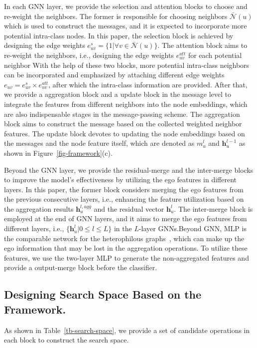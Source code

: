\documentclass[sigconf]{acmart}
\def\bh{\textbf{h}}
\begin{document}
In each GNN layer, we provide the selection and attention blocks to choose and re-weight the neighbors.  The former is responsible for choosing neighbors $\bar{\mathcal{N}}(u)$ which is used to construct the messages, and it is expected to incorporate more potential intra-class nodes.
In this paper, the selection block is achieved by designing the edge weights $e_{uv}^s =  \{1| \forall v \in \bar{\mathcal{N}}(u)\}$.
The attention block aims to re-weight the neighbors, i.e., designing the edge weights $e_{uv}^{att}$ for each potential neighbor
With the help of these two blocks, more potential intra-class neighbors can be incorporated and emphasized by attaching different edge weights $e_{uv} = e_{uv}^s\times e_{uv}^{att}$, after which the intra-class information are provided.
After that, we provide a aggregation block and a update block in the message level to integrate the features from different neighbors into the node embeddings, which are also indispensable stages in the message-passing scheme.
The aggregation block aims to construct the message based on the collected weighted neighbor features.
The update block devotes to updating the node embeddings based on the messages and the node feature itself, which are denoted as $m_u^l$ and $\bh_u^{l-1}$ as shown in Figure~\ref{fig-framework}(c).

Beyond the GNN layer, we provide the residual-merge and the inter-merge blocks to improve the model's effectiveness by utilizing the ego features in different layers. In this paper, the former block considers merging the ego features from the previous consecutive layers, i.e., enhancing the feature utilization based on the aggregation results $\bh_u^{l,agg}$ and the residual vector $\bh_u^l$.
The inter-merge block is employed at the end of GNN layers, and it aims to merge the ego features from different layers, i.e., $\{\bh_u^l|0\leq l \leq L\}$ in the $L$-layer GNNs.Beyond GNN, MLP is the comparable network for the heterophilous graphs~\cite{ma2021homophily}, which can make up the ego information that may be lost in the aggregation operations. To utilize these features, we use the two-layer MLP to generate the non-aggregated features and provide a output-merge block before the classifier. 



\subsection{Designing Search Space Based on the Framework.}
\label{sec-search-space}
As shown in Table~\ref{tb-search-space}, we provide a set of candidate operations in each block to construct the search space.
\end{document}
